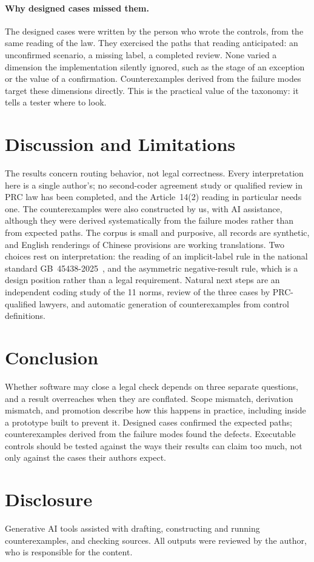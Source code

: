 \documentclass[sigconf,review,anonymous]{acmart}
\begin{document}
\paragraph{Why designed cases missed them.} The designed cases were written by the person who wrote the controls, from the same reading of the law. They exercised the paths that reading anticipated: an unconfirmed scenario, a missing label, a completed review. None varied a dimension the implementation silently ignored, such as the stage of an exception or the value of a confirmation. Counterexamples derived from the failure modes target these dimensions directly. This is the practical value of the taxonomy: it tells a tester where to look.

\section{Discussion and Limitations}

The results concern routing behavior, not legal correctness. Every interpretation here is a single author's; no second-coder agreement study or qualified review in PRC law has been completed, and the Article~14(2) reading in particular needs one. The counterexamples were also constructed by us, with AI assistance, although they were derived systematically from the failure modes rather than from expected paths. The corpus is small and purposive, all records are synthetic, and English renderings of Chinese provisions are working translations. Two choices rest on interpretation: the reading of an implicit-label rule in the national standard GB~45438-2025~\cite{gb45438}, and the asymmetric negative-result rule, which is a design position rather than a legal requirement. Natural next steps are an independent coding study of the 11 norms, review of the three cases by PRC-qualified lawyers, and automatic generation of counterexamples from control definitions.

\section{Conclusion}

Whether software may close a legal check depends on three separate questions, and a result overreaches when they are conflated. Scope mismatch, derivation mismatch, and promotion describe how this happens in practice, including inside a prototype built to prevent it. Designed cases confirmed the expected paths; counterexamples derived from the failure modes found the defects. Executable controls should be tested against the ways their results can claim too much, not only against the cases their authors expect.

\section*{Disclosure}
Generative AI tools assisted with drafting, constructing and running counterexamples, and checking sources. All outputs were reviewed by the author, who is responsible for the content. %



\end{document}
